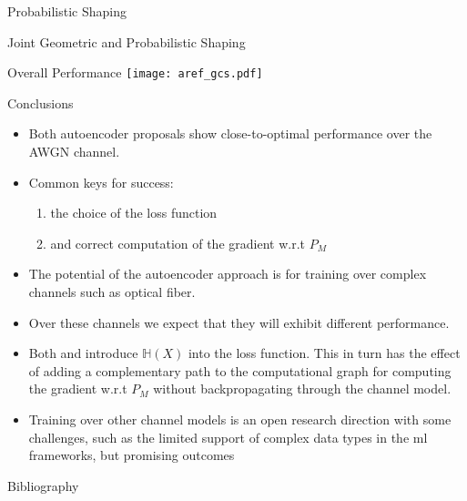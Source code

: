 \documentclass[english,aspectratio=1610,9pt,helvet,nicetitles]{ICEbeamerTUMCD}
\begin{document}
\begin{frame}{Probabilistic Shaping}
	

\end{frame}

\begin{frame}{Joint Geometric and Probabilistic Shaping}
	
\end{frame}

\begin{frame}{Overall Performance}
	\centering
	\texttt{[image: aref\_gcs.pdf]}
	\label{fig:arefPerf}

\end{frame}

\begin{frame}{Conclusions}
\begin{itemize}
\item Both autoencoder proposals show close-to-optimal performance over the AWGN channel.
\item Common keys for success:
	\begin{enumerate}
	\item the choice of the loss function
	\item and correct computation of the gradient w.r.t $P_M$
\end{enumerate}	 
\item The potential of the autoencoder approach is for training over complex channels such as optical fiber.\\
\item Over these channels we expect that they will exhibit different performance.
\item Both \citep{Aref} and \cite{Stark} introduce $\mathbb{H}(X)$ into the loss function. This in turn has the effect of adding a complementary path to the computational graph for computing the gradient w.r.t $P_M$ without backpropagating through the channel model.
\item Training over other channel models is an open research direction with some challenges, such as the limited support of complex data types in the ml frameworks, but promising outcomes
\end{itemize}
\end{frame}

\begin{frame}{Bibliography}
\printbibliography[heading=none]
\end{frame}

\end{document}
